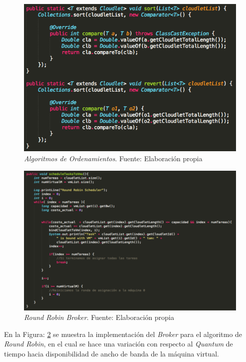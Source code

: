 \renewcommand\thefigure{\arabic{figure}}
\begin{figure}[h!]
	\centering
	\includegraphics[scale=0.5]{media/ordenamientos}
	\caption{\textit{Algoritmos de Ordenamientos}. Fuente: Elaboración propia}
	\label{fig:sortRevert}
\end{figure}

\renewcommand\thefigure{\arabic{figure}}
\begin{figure}[h!]
	\centering
	\includegraphics[scale=0.4]{media/RRBroker}
	\caption{\textit{Round Robin Broker}. Fuente: Elaboración propia}
	\label{fig:RRBroker}
\end{figure}

En la Figura: \ref{fig:RRBroker} se muestra la implementación del \textit{Broker} para el algoritmo de \textit{Round Robin}, en el cual se hace una variación con respecto al \textit{Quantum} de tiempo hacia disponibilidad de ancho de banda de la máquina virtual.




